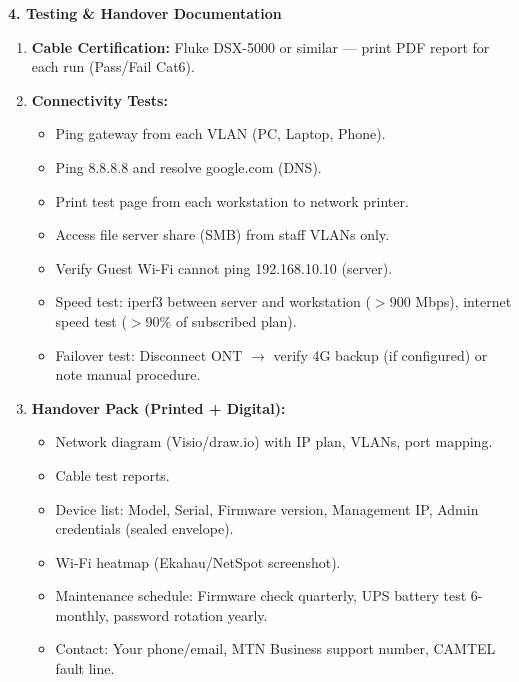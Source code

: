 \documentclass[11pt]{article}
\begin{document}
\begin{exoresolu}
\textbf{4. Testing \& Handover Documentation}

\begin{enumerate}
\item \textbf{Cable Certification:} Fluke DSX-5000 or similar — print PDF report for each run (Pass/Fail Cat6).
\item \textbf{Connectivity Tests:}
      \begin{itemize}
      \item Ping gateway from each VLAN (PC, Laptop, Phone).
      \item Ping 8.8.8.8 and resolve google.com (DNS).
      \item Print test page from each workstation to network printer.
      \item Access file server share (SMB) from staff VLANs only.
      \item Verify Guest Wi-Fi cannot ping 192.168.10.10 (server).
      \item Speed test: iperf3 between server and workstation ($>900$ Mbps), internet speed test ($>90\%$ of subscribed plan).
      \item Failover test: Disconnect ONT $\rightarrow$ verify 4G backup (if configured) or note manual procedure.
      \end{itemize}
\item \textbf{Handover Pack (Printed + Digital):}
      \begin{itemize}
      \item Network diagram (Visio/draw.io) with IP plan, VLANs, port mapping.
      \item Cable test reports.
      \item Device list: Model, Serial, Firmware version, Management IP, Admin credentials (sealed envelope).
      \item Wi-Fi heatmap (Ekahau/NetSpot screenshot).
      \item Maintenance schedule: Firmware check quarterly, UPS battery test 6-monthly, password rotation yearly.
      \item Contact: Your phone/email, MTN Business support number, CAMTEL fault line.
      \end{itemize}
\end{enumerate}
\end{exoresolu}
\end{document}
